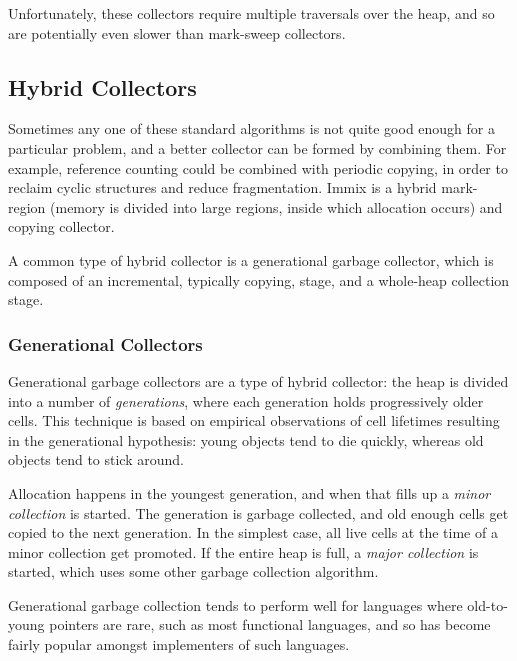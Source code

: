 Unfortunately, these collectors require multiple traversals over the
heap, and so are potentially even slower than mark-sweep
collectors\cite{GarbageCollection}.

\subsection{Hybrid Collectors}
\label{sec:lit-gc-hybrid}

Sometimes any one of these standard algorithms is not quite good
enough for a particular problem, and a better collector can be formed
by combining them. For example, reference counting could be combined
with periodic copying, in order to reclaim cyclic structures and
reduce fragmentation. Immix\cite{Blackburn08} is a hybrid mark-region
(memory is divided into large regions, inside which allocation occurs)
and copying collector.

A common type of hybrid collector is a generational garbage collector,
which is composed of an incremental, typically copying, stage, and a
whole-heap collection stage.

\subsubsection{Generational Collectors}
\label{sec:lit-gc-hybrid-generational}

Generational garbage collectors are a type of hybrid collector: the
heap is divided into a number of \textit{generations}, where each
generation holds progressively older cells. This technique is based on
empirical observations of cell lifetimes resulting in the generational
hypothesis: young objects tend to die quickly, whereas old objects
tend to stick around\cite{Ungar84}.

Allocation happens in the youngest generation, and when that fills up
a \textit{minor collection} is started. The generation is garbage
collected, and old enough cells get copied to the next
generation\cite{Ungar84}. In the simplest case, all live cells at the
time of a minor collection get promoted. If the entire heap is full, a
\textit{major collection} is started, which uses some other garbage
collection algorithm\cite{GarbageCollection}.

Generational garbage collection tends to perform well for languages
where old-to-young pointers are rare\cite{Appel89}, such as most
functional languages, and so has become fairly popular amongst
implementers of such
languages\cite{Rojemo95}\cite{Sansom93}\cite{Seward92}.

